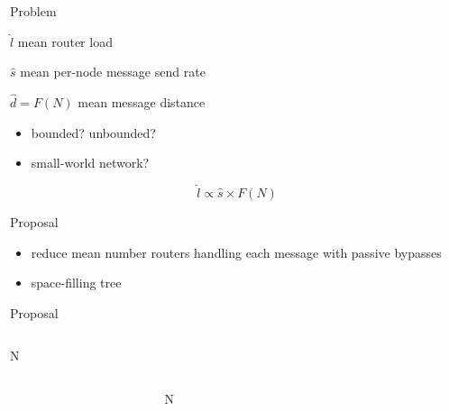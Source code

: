\begin{frame}{Problem}

$\hat{l}$ mean router load

$\hat{s}$ mean per-node message send rate

$\hat{d} = F(N)$ mean message distance
\begin{itemize}
\item bounded? unbounded?
\item small-world network?
\end{itemize}

{\Huge
\[
\hat{l} \propto \hat{s} \times F(N)
\]}

\end{frame}

\begin{frame}{Proposal}

\begin{itemize}
\item reduce mean number routers handling each message with passive bypasses
\item space-filling tree
\end{itemize}

\end{frame}

\begin{frame}{Proposal}

\begin{columns}
\begin{column}{0.225\textwidth}
\raggedleft
\Huge
N
\end{column}
\begin{column}{0.225\textwidth}
\end{column}
\end{columns}

\begin{columns}
\begin{column}{0.225\textwidth}
\end{column}
\begin{column}{0.65\textwidth}
\centering
\Huge
N
\end{column}
\begin{column}{0.225\textwidth}
\end{column}
\end{columns}

\end{frame}

